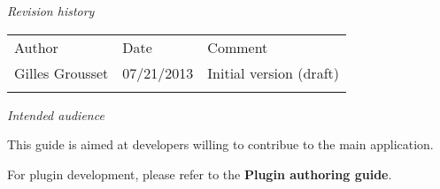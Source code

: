 \emph{Revision history}

\begin{longtable}[c]{@{}lll@{}}
\toprule\addlinespace
Author & Date & Comment
\\\addlinespace
\midrule\endhead
Gilles Grousset & 07/21/2013 & Initial version (draft)
\\\addlinespace
\bottomrule
\end{longtable}

\emph{Intended audience}

This guide is aimed at developers willing to contribue to the main
application.

For plugin development, please refer to the \textbf{Plugin authoring
guide}.
